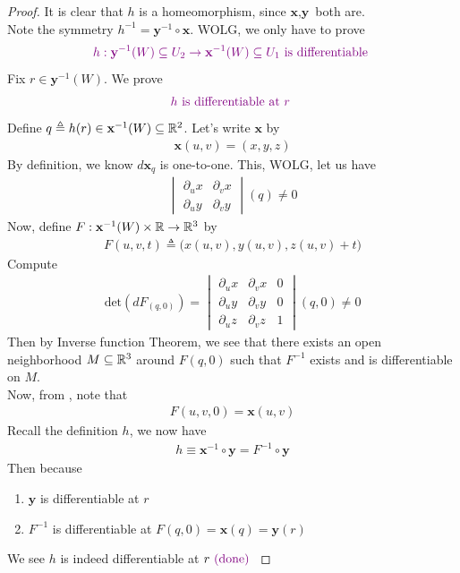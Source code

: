 \documentclass{report}
\begin{document}
\begin{proof}
It is clear that $h$ is a homeomorphism, since $\textbf{x},\textbf{y}$ both are. \\

Note the symmetry $h^{-1}=\textbf{y}^{-1}\circ \textbf{x}$. WOLG, we only have to prove 
\begin{align*}
\textcolor{violet}{h:\textbf{y}^{-1}(W)\subseteq U_2\rightarrow \textbf{x}^{-1}(W)\subseteq U_1\text{ is differentiable }}
\end{align*}
Fix $r \in \textbf{y}^{-1}(W)$. We prove 
\begin{align*}
  \textcolor{violet}{h\text{ is differentiable at $r$ }}
\end{align*}
Define $q\triangleq h(r) \in \textbf{x}^{-1}(W)\subseteq \mathbb{R}^2$. Let's write $\textbf{x}$ by 
\begin{align*}
\textbf{x}(u,v)=(x,y,z)
\end{align*}
By definition, we know $d\textbf{x}_q$ is one-to-one. This, WOLG, let us have 
\begin{align*}
\begin{vmatrix} 
  \partial_u x & \partial_v x\\
  \partial_u y & \partial_v y
\end{vmatrix}(q)\neq 0
\end{align*}
Now, define $F:\textbf{x}^{-1}(W)\times \mathbb{R}\rightarrow \mathbb{R}^3$ by  
\begin{align}
\label{CC1}
F(u,v,t)\triangleq  \Big(x(u,v),y(u,v),z(u,v)+t \Big)
\end{align}
Compute 
\begin{align*}
  \text{det}(dF_{(q,0)})=\begin{vmatrix}
  \partial_u x & \partial_v x & 0\\
  \partial_u y & \partial_v y & 0\\
  \partial_u z & \partial_v z & 1 
\end{vmatrix}(q,0)\neq 0 
\end{align*}
Then by Inverse function Theorem, we see that there exists an open neighborhood $M\subseteq \mathbb{R}^3$ around $F(q,0)$ such that $F^{-1}$ exists and is differentiable on $M$.\\

Now, from , note that 
\begin{align*}
F(u,v,0)=\textbf{x}(u,v)
\end{align*}
Recall the definition $h$, we now have 
\begin{align*}
h\equiv \textbf{x}^{-1}\circ \textbf{y}=F^{-1}\circ \textbf{y}
\end{align*}
Then because 
\begin{enumerate}[label=(\alph*)]
  \item $\textbf{y}$ is differentiable at $r$ 
   \item $F^{-1}$ is differentiable at $F(q,0)=\textbf{x}(q)=\textbf{y}(r)$ 
\end{enumerate}
We see $h$ is indeed differentiable at $r\textcolor{violet}{\text{ (done) }}$
\end{proof}
\end{document}
